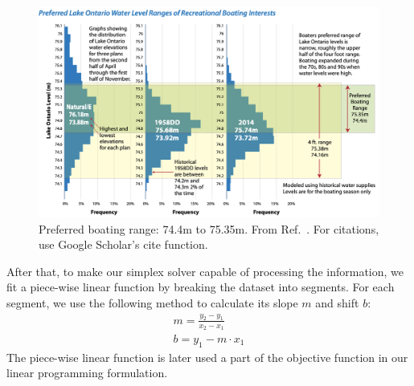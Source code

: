 \documentclass[pre,12pt]{revtex4-1}
\begin{document}
\begin{figure}[htbp]
\begin{center}
\includegraphics[width=4.5in]{boating2.png}
\caption{Preferred boating range: 74.4m to 75.35m.  From Ref.~\cite{nd97}. For citations, use Google Scholar's cite function.}
\label{leaf}
\end{center}
\end{figure}

After that, to make our simplex solver capable of processing the information, we fit a piece-wise linear function by breaking the dataset into segments. For each segment, we use the following method to calculate its slope $m$ and shift $b$:
\begin{align}
    m = \frac{y_{2} - y_{1}}{x_{2} - x_{1}}\\
    b = y_{1} - m \cdot x_{1}
\end{align}
The piece-wise linear function is later used a part of the objective function in our linear programming formulation.
\end{document}
